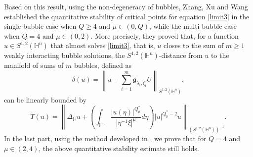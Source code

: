 \documentclass[11pt]{article}
\begin{document}
Based on this result, using the non-degeneracy of bubbles, Zhang, Xu and Wang \cite{ZXW25} established the quantitative
stability of critical points for equation \eqref{limit3} in the single-bubble case when $Q\geq4$ and $\mu\in (0,Q)$, while the multi-bubble case when $Q=4$ and $\mu\in (0,2)$. More precisely, they proved that,
for a function $u\in S^{1,2}(\mathbb{H}^{n})$ that almost solves \eqref{limit3}, that is, $u$ closes to
the sum of $m\geq1$ weakly interacting  bubble solutions,
the $S^{1,2}(\mathbb{H}^{n})$-distance from $u$ to the manifold of sums of $m$ bubbles,
defined as
\begin{equation*}
\delta(u)=\left\|u-\sum\limits_{i=1}^m\mathfrak{g}_{\lambda_i ,\xi_i } U\right\|_{S^{1,2}(\mathbb{H}^{n})},
\end{equation*}
 can be linearly bounded by
\begin{equation*} \Upsilon(u)=\left\|\Delta_{\mathbb{H}}u+\left(\int_{\mathbb{H}^{n}}\frac{|u(\eta)|^{Q^{\ast}_{\mu}}}{|\eta^{-1}\xi|^{\mu}}{d}\eta\right)|u|^{Q^{\ast}_{\mu}-2}u\right\|_{(S^{1,2}(\mathbb{H}^{n}))^{-1}}.
	\end{equation*}
In the last part, using the method developed in \cite{CFL25}, we prove that for $Q=4$ and $\mu\in (2,4)$, the above quantitative stability estimate still holds.
\end{document}
